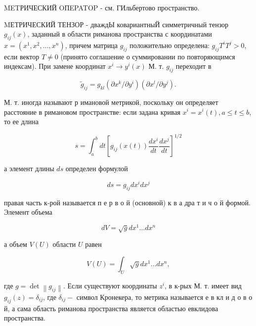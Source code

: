 \documentclass[10pt]{article}
\begin{document}
METРИЧЕСКИЙ OПEPATOP - см. ГИльбертово пространство.



MЕТРИЧЕСКИЙ ТЕНЗОР - дваждЫ ковариантныЙ симметричный тензор $g_{i j}(x)$, заданный в области риманова пространства с координатами $x=\left(x^{1}, x^{2}, \ldots, x^{n}\right)$, причем матрица $g_{i j}$ положительно определена: $g_{i j} T^{i} T^{j}>0$, если вектор $T \neq 0$ (принято соглашение о суммировании по повторяющимся индексам). При замене координат $x^{i} \rightarrow y^{i}(x)$ М. т. $g_{i j}$ переходит в



\[

\tilde{g}_{i j}=g_{k l}\left(\partial x^{k} / \partial y^{i}\right)\left(\partial x^{l} / \partial y^{j}\right) .

\]



М. т. иногда называют р имановой метрикой, поскольку он определяет расстояние в римановом пространстве: если задана кривая $x^{i}=x^{i}(t), a \leqslant t \leqslant b$, то ее длина



\[

s=\int_{a}^{b} d t\left[g_{i j}(x(t)) \frac{d x^{i}}{d t} \frac{d x^{j}}{d t}\right]^{1 / 2}

\]



а элемент длины $d s$ определен формулой



\[

d s=g_{i j} d x^{i} d x^{j}

\]



правая часть к-рой называется п е р в о й (основной) к в а дра т и ч о й формой. Элемент объема



\[

d V=\sqrt{g} d x^{1} \ldots d x^{n}

\]



а объем $V(U)$ области $U$ равен



\[

V(U)=\int_{U} \sqrt{g} d x^{1} \ldots d x^{n},

\]



где $g=\operatorname{det}\left\|g_{i j}\right\|$. Если существуют координаты $z^{i}$, в к-рых М. т. имеет вид $g_{i j}(z)=\delta_{i j}$, где $\delta_{i j}-$ символ Кронекера, то метрика называется е в кл и д о в о й, а сама область риманова пространства является областью евклидова пространства.
\end{document}
